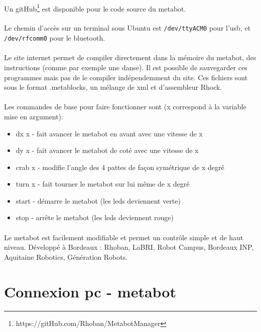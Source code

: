 \documentclass[10pt,a4paper]{report}
\begin{document}
\paragraph{}
Un  gitHub\footnote{https://gitHub.com/Rhoban/MetabotManager} est disponible pour le code source du metabot.
\paragraph{}
Le chemin d'accès sur un terminal sous Ubuntu est \texttt{/dev/ttyACM0} pour l'usb, et \texttt{/dev/rfcomm0} pour le bluetooth. 

\paragraph{}
Le site internet permet de compiler directement dans la mémoire du metabot, des instructions (comme par exemple une danse). Il est possible de sauvegarder ces programmes mais pas de le compiler indépendemment du site. Ces fichiers sont sous le format .metablocks, un mélange de xml et d'assembleur Rhock.
\paragraph{}
Les commandes de base pour faire fonctionner sont (x correspond à la variable mise en argument):\\
\begin{itemize}
\item dx x - fait avancer le metabot en avant avec une vitesse de x
\item dy x - fait avancer le metabot de coté avec une vitesse de x
\item crab x - modifie l'angle des 4 pattes de façon symétrique de x degré
\item turn x - fait tourner le metabot sur lui même de x degré
\item start - démarre le metabot (les  leds deviennent verte)
\item stop - arrête le metabot (les  leds deviennent rouge)
\end{itemize}
\paragraph{}
Le metabot est facilement modifiable et permet un contrôle simple et de haut niveau.
Développé à Bordeaux : Rhoban, LaBRI, Robot Campus, Bordeaux INP, Aquitaine Robotics, Génération Robots.

\section{Connexion pc - metabot}
\end{document}
